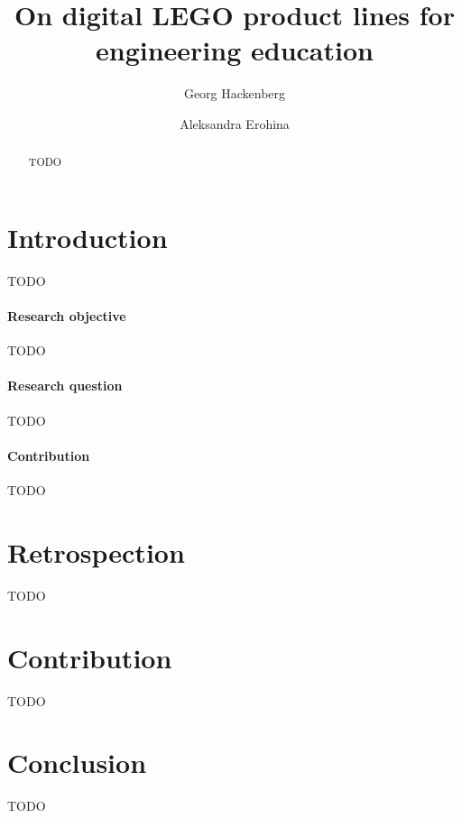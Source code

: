 \documentclass[sigconf,review]{acmart}
\begin{document}
\title{On digital LEGO product lines for engineering education}

\author{Georg Hackenberg}

\author{Aleksandra Erohina}

\begin{abstract}
    TODO
\end{abstract}


\maketitle

\section{Introduction}
\label{sec:introduction}

TODO~\cite{Hackenberg_2023}

\paragraph{Research objective}

TODO

\paragraph{Research question}

TODO

\paragraph{Contribution}

TODO

\section{Retrospection}
\label{sec:retrospection}

TODO

\section{Contribution}
\label{sec:contribution}

TODO

\section{Conclusion}
\label{sec:conclusion}

TODO



\end{document}
